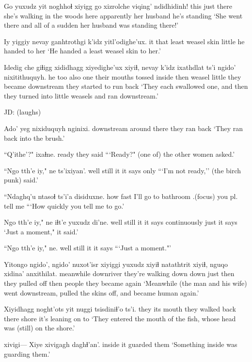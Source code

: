 \documentclass[12pt]{article}
\begin{document}
\gll Go yuxudz yit noghhoɬ xiyigg go xizrolche viqing' ndidhidinh!
this just there {she's walking} {in the woods} here apparently {her husband} {he's standing}
\glt `She went there and all of a sudden her husband was standing there!'
\glend

\gll Iy yiggiy {nevay ganhtrothgi} k'idz yitl'odighe'ux.
it that {least weasel skin} little {he handed to her}
\glt `He handed a least weasel skin to her.'
\glend

\gll Idedig che giɬigg xididhagg xiyedighe'ux xiyiɬ, nevay k'idz ixathdlat ts'i ngido' nixitithuquyh.
{he too} also one {their mouths} {tossed inside} then weasel little {they became} {} downstream {they started to run back}
\glt `They each swallowed one, and then they turned into little weasels and ran downstream.'
\glend

JD:  (laughs)

\gll Ado' yeg nixiduquyh nginixi.
{downstream} {around there} {they ran} back
\glt `They ran back into the brush.'
\glend

\gll ``Q'ithe'?" ixaɬne.
ready {they said}
\glt ```Ready?" (one of) the other women asked.'
\glend

\gll ``Ngo tth'e iy," ne ts'ixiyan'.
well still it {it says} only
\glt ```I'm not ready,'' (the birch punk) said.'
\glend

\gll ``Ndaghq'u ntasoɬ ts'i'a disiduxne.
{how fast} {I'll go to bathroom} {}.{(focus)} {you pl. tell me}
\glt ```How quickly you tell me to go.'
\glend

\gll Ngo tth'e iy," ne iɬt'e yuxudz di'ne.
well still it {it says} continuously just {it says}
\glt `Just a moment," it said.'
\glend

\gll ``Ngo tth'e iy," ne.
well still it {it says}
\glt ```Just a moment."'
\glend

\gll Yitongo ngido', ngido' nuxot'isr xiyiggi yuxudz xiyiɬ natathtrit xiyiɬ, {nguqo xidina'} anxithilat.
meanwhile {downriver} {} {they're walking down} down just then {they pulled off} then people {they became again}
\glt `Meanwhile (the man and his wife) went downstream, pulled the skins off, and became human again.'
\glend

\gll Xiyidhagg noght'ots yit nuggi tsisdiniɬ'o ts'i.
{they its mouth} {they walked back} there shore {it's leaning on} to 
\glt `They entered the mouth of the fish, whose head was (still) on the shore.'
\glend

\gll  xivigi--- Xiye {xivigagh daghɬ'an'.}
{} inside {it guarded them}
\glt `Something inside was guarding them.'
\glend
\end{document}
